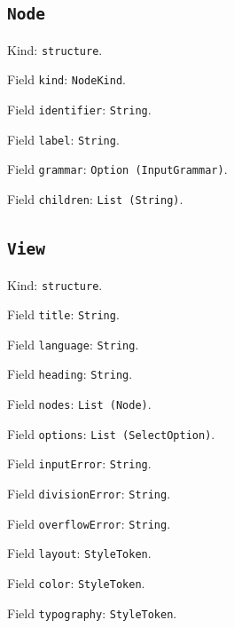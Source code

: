 \documentclass[11pt]{article}
\begin{document}
\subsection*{\texttt{Node}}
\noindent Kind: \texttt{structure}.\par
\noindent Field \texttt{kind}: \texttt{NodeKind}.\par
\noindent Field \texttt{identifier}: \texttt{String}.\par
\noindent Field \texttt{label}: \texttt{String}.\par
\noindent Field \texttt{grammar}: \texttt{Option (InputGrammar)}.\par
\noindent Field \texttt{children}: \texttt{List (String)}.\par
\subsection*{\texttt{View}}
\noindent Kind: \texttt{structure}.\par
\noindent Field \texttt{title}: \texttt{String}.\par
\noindent Field \texttt{language}: \texttt{String}.\par
\noindent Field \texttt{heading}: \texttt{String}.\par
\noindent Field \texttt{nodes}: \texttt{List (Node)}.\par
\noindent Field \texttt{options}: \texttt{List (SelectOption)}.\par
\noindent Field \texttt{inputError}: \texttt{String}.\par
\noindent Field \texttt{divisionError}: \texttt{String}.\par
\noindent Field \texttt{overflowError}: \texttt{String}.\par
\noindent Field \texttt{layout}: \texttt{StyleToken}.\par
\noindent Field \texttt{color}: \texttt{StyleToken}.\par
\noindent Field \texttt{typography}: \texttt{StyleToken}.\par
\end{document}
